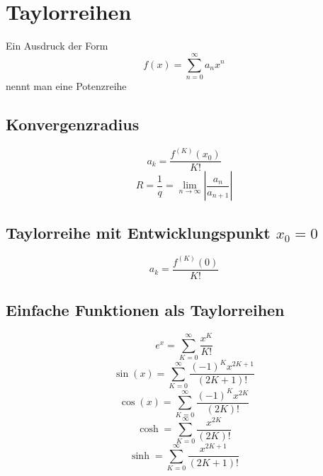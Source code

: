 \section{Taylorreihen}
Ein Ausdruck der Form 
\[ \boxed{f(x) = \sum_{n = 0}^{\infty} a_n x^n} \]
nennt man eine Potenzreihe
\subsection{Konvergenzradius}
\[ \boxed{a_k = \frac{f^{(K)}(x_0)}{K!}} \]
\[ \boxed{R = \frac{1}{q} = \lim_{n \rightarrow \infty} \left| \frac{a_n}{a_{n + 1}} \right|} \]
\subsection{Taylorreihe mit Entwicklungspunkt $x_0 = 0$}
\[ \boxed{a_k = \frac{f^{(K)}(0)}{K!}} \]
\subsection{Einfache Funktionen als Taylorreihen}
\[ \boxed{e^x = \sum_{K=0}^{\infty} \frac{x^K}{K!}} \]
\[ \boxed{\sin(x) = \sum_{K=0}^{\infty} \frac{(-1)^K x^{2K+1}}{(2K+1)!}} \]
\[ \boxed{\cos(x) = \sum_{K=0}^{\infty} \frac{(-1)^K x^{2K}}{(2K)!}} \]
\[ \boxed{\cosh = \sum_{K=0}^{\infty} \frac{x^{2K}}{(2K)!}} \]
\[ \boxed{\sinh = \sum_{K=0}^{\infty} \frac{x^{2K+1}}{(2K+1)!}} \]
